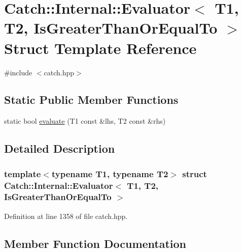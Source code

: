 \hypertarget{struct_catch_1_1_internal_1_1_evaluator_3_01_t1_00_01_t2_00_01_is_greater_than_or_equal_to_01_4}{}\section{Catch\+:\+:Internal\+:\+:Evaluator$<$ T1, T2, Is\+Greater\+Than\+Or\+Equal\+To $>$ Struct Template Reference}
\label{struct_catch_1_1_internal_1_1_evaluator_3_01_t1_00_01_t2_00_01_is_greater_than_or_equal_to_01_4}


{\ttfamily \#include $<$catch.\+hpp$>$}

\subsection*{Static Public Member Functions}
\begin{DoxyCompactItemize}
\item 
static bool \hyperlink{struct_catch_1_1_internal_1_1_evaluator_3_01_t1_00_01_t2_00_01_is_greater_than_or_equal_to_01_4_a5ba107c6da4292b6492a0e5e906f9484}{evaluate} (T1 const \&lhs, T2 const \&rhs)
\end{DoxyCompactItemize}


\subsection{Detailed Description}
\subsubsection*{template$<$typename T1, typename T2$>$\newline
struct Catch\+::\+Internal\+::\+Evaluator$<$ T1, T2, Is\+Greater\+Than\+Or\+Equal\+To $>$}



Definition at line 1358 of file catch.\+hpp.



\subsection{Member Function Documentation}
\hypertarget{struct_catch_1_1_internal_1_1_evaluator_3_01_t1_00_01_t2_00_01_is_greater_than_or_equal_to_01_4_a5ba107c6da4292b6492a0e5e906f9484}{}\label{struct_catch_1_1_internal_1_1_evaluator_3_01_t1_00_01_t2_00_01_is_greater_than_or_equal_to_01_4_a5ba107c6da4292b6492a0e5e906f9484} 
